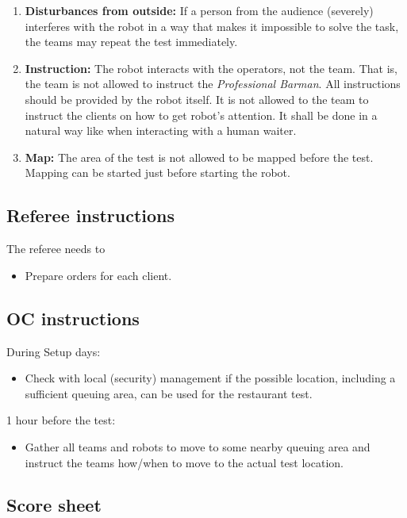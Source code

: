 \begin{enumerate}[nosep]
	\item \textbf{Disturbances from outside:} If a person from the audience (severely) interferes with the robot in a way that makes it impossible to solve the task, the teams may repeat the test immediately.

	\item \textbf{Instruction:} The robot interacts with the operators, not the team. That is, the team is not allowed to instruct the \textit{Professional Barman}. All instructions should be provided by the robot itself.
	It is not allowed to the team to instruct the clients on how to get robot's attention. It shall be done in a natural way like when interacting with a human waiter.

    \item \textbf{Map:} The area of the test is not allowed to be mapped before the test. Mapping can be started just before starting the robot.

\end{enumerate}

\subsection{Referee instructions}

The referee needs to
\begin{itemize}
	\item Prepare orders for each client.
\end{itemize}

\subsection{OC instructions}
During Setup days:
\begin{itemize}[nosep]
	\item Check with local (security) management if the possible location, including a sufficient queuing area, can be used for the restaurant test.
\end{itemize}

1 hour before the test:
\begin{itemize}[nosep]
	\item Gather all teams and robots to move to some nearby queuing area and instruct the teams how/when to move to the actual test location.
\end{itemize}

\newpage
\subsection{Score sheet}




